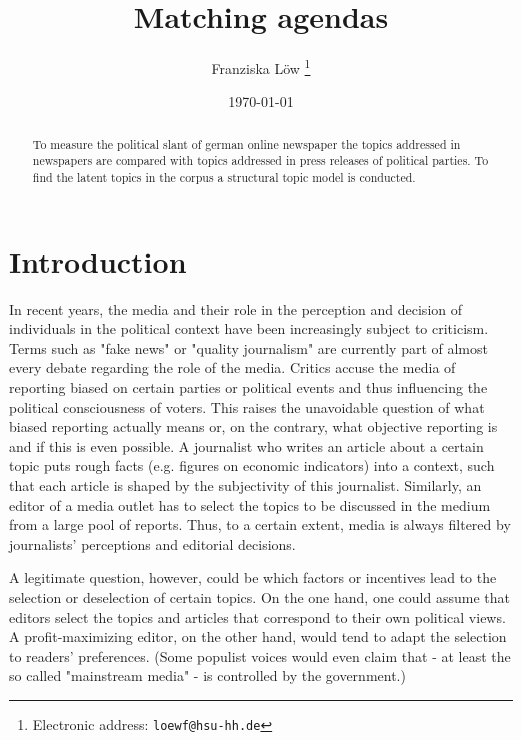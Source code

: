 \documentclass[12pt,a4paper,notitlepage]{article}
\title{Matching agendas}
\date{\today}
\author{Franziska Löw
  \thanks{Electronic address: \texttt{loewf@hsu-hh.de}}}
\affil{Department of Industrial Economics,\\ Helmut Schmidt University,\\ Hamburg, Germany}
\begin{document}
\begin{titlepage}
	\maketitle
	\begin{abstract}
	To measure the political slant of german online newspaper the topics addressed in newspapers are compared with topics addressed in press releases of political parties. To find the latent topics in the corpus a structural topic model is conducted. 

	\end{abstract}

\end{titlepage}

\tableofcontents

\pagebreak


\section{Introduction}

In recent years, the media and their role in the perception and decision of individuals in the political context have been increasingly subject to criticism. Terms such as "fake news" or "quality journalism" are currently part of almost every debate regarding the role of the media. Critics accuse the media of reporting biased on certain parties or political events and thus influencing the political consciousness of voters. This raises the unavoidable question of what biased reporting actually means or, on the contrary, what objective reporting is and if this is even possible. A journalist who writes an article about a certain topic puts rough facts (e.g. figures on economic indicators) into a context, such that each article is shaped by the subjectivity of this journalist. Similarly, an editor of a media outlet has to select the topics to be discussed in the medium from a large pool of reports. Thus, to a certain extent, media is always filtered by journalists' perceptions and editorial decisions. 

A legitimate question, however, could be which factors or incentives lead to the selection or deselection of certain topics. On the one hand, one could assume that editors select the topics and articles that correspond to their own political views. A profit-maximizing editor, on the other hand, would tend to adapt the selection to readers' preferences. (Some populist voices would even claim that - at least the so called "mainstream media" - is controlled by the government.) 
\end{document}
